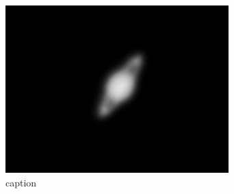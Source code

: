 \documentclass[main]{subfiles}
\begin{document}
\begin{figure}[htbp]
	\centering
	\includegraphics[keepaspectratio, width=\linewidth]{figures/Saturn.jpg}
	\caption{caption}
	\label{fig:label}
\end{figure}
\end{document}
